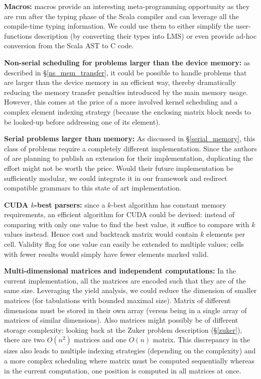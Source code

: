 \ole
\item \textbf{Macros:} macros provide an interesting meta-programming opportunity as they are run after the typing phase of the Scala compiler and can leverage all the compile-time typing information. We could use them to either simplify the user-functions description (by converting their types into LMS) or even provide ad-hoc conversion from the Scala AST to C code.
\item \textbf{Non-serial scheduling for problems larger than the device memory:} as described in \S\ref{ns_mem_transfer}, it could be possible to handle problems that are larger than the device memory in an efficient way, thereby dramatically reducing the memory transfer penalties introduced by the main memory usage. However, this comes at the price of a more involved kernel scheduling and a complex element indexing strategy (because the enclosing matrix block needs to be looked-up before addressing one of its element).
\item \textbf{Serial problems larger than memory:} As discussed in \S\ref{serial_memory}, this class of problems require a completely different implementation. Since the authors of \cite{swat_mega} are planning to publish an extension for their implementation, duplicating the effort might not be worth the price. Would their future implementation be sufficiently modular, we could integrate it in our framework and redirect compatible grammars to this state of art implementation.
\item \textbf{CUDA $k$-best parsers:} since a $k$-best algorithm has constant memory requirements, an efficient algorithm for CUDA could be devised: instead of comparing with only one value to find the best value, it suffice to compare with $k$ values instead. Hence cost and backtrack matrix would contain $k$ elements per cell. Validity flag for one value can easily be extended to multiple values; cells with fewer results would simply have fewer elements marked valid.
\item \textbf{Multi-dimensional matrices and independent computations:} In the current implementation, all the matrices are encoded such that they are of the same size. Leveraging the yield analysis, we could reduce the dimension of smaller matrices (for tabulations with bounded maximal size). Matrix of different dimensions must be stored in their own array (versus being in a single array of matrices of similar dimensions). Also matrices might possibly be of different storage complexity: looking back at the Zuker problem description (\S\ref{zuker}), there are two $O(n^2)$ matrices and one $O(n)$ matrix. This discrepancy in the sizes also leads to multiple indexing strategies (depending on the complexity) and a more complex scheduling where matrix must be computed sequentially whereas in the current computation, one position is computed in all matrices at once.
